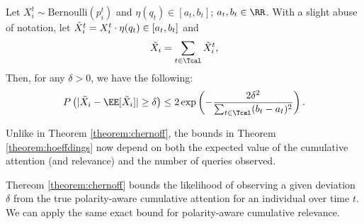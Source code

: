 \begin{theorem} \label{theorem:hoeffdings}
Let $X_i^t \sim \text{Bernoulli}(p_i^t)$ and $\eta(q_t) \in [a_t, b_t]$; $a_t, b_t \in \RR$. With a slight abuse of notation, let $\Tilde{X}_i^t = X_i^t\cdot \eta(q_t) \in [a_t, b_t]$ and
\[
    \Tilde{X}_i = \sum_{t\in \Tcal} \Tilde{X}_i^t,
\]
Then, for any $\delta > 0$, we have the following:
\[
    P\left(|\Tilde{X}_i - \EE[\Tilde{X}_i]| \geq \delta\right) \leq 2\exp\left(-\frac{2\delta^2}{\sum_{t \in \Tcal} (b_t - a_t)^2}\right).
\]
\end{theorem}

\begin{remark}
    Unlike in Theorem \ref{theorem:chernoff}, the bounds in Theorem \ref{theorem:hoeffdings} now depend on both the expected value of the cumulative attention (and relevance) and the number of queries observed.
\end{remark}

Thereom \ref{theorem:chernoff} bounds the likelihood of observing a given deviation $\delta$ from the true polarity-aware cumulative attention for an individual over time $t$. We can apply the same exact bound for polarity-aware cumulative relevance.








